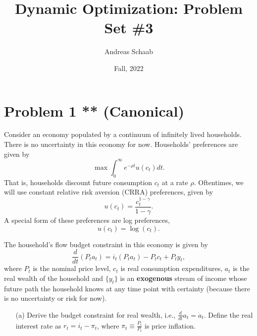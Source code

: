 \documentclass[11pt]{extarticle}
\title{Dynamic Optimization: Problem Set \#3}
\author{Andreas Schaab}
\date{Fall, 2022}
\theoremstyle{plain}
\theoremstyle{definition}
\begin{document}
\maketitle
\thispagestyle{empty}
\setcounter{page}{0}


\vspace{10mm}
\section*{Problem 1 ** (Canonical)}


Consider an economy populated by a continuum of infinitely lived households. There is no uncertainty in this economy for now. Households' preferences are given by
\begin{equation*}
	\max \int_0^\infty e^{-\rho t} u(c_t) dt.
\end{equation*}
That is, households discount future consumption $c_t$ at a rate $\rho$. Oftentimes, we will use constant relative risk aversion (CRRA) preferences, given by
\begin{equation*}
	u(c_t) = \frac{c_t^{1-\gamma}}{1-\gamma}.
\end{equation*}
A special form of these preferences are log preferences, 
\begin{equation*}
	u(c_t) = \log(c_t). 
\end{equation*}



The household's flow budget constraint in this economy is given by
\begin{equation*}
	\frac{d}{dt}(P_t a_t) = i_t (P_t a_t) - P_t c_t + P_t y_t,
\end{equation*}
where $P_t$ is the nominal price level, $c_t$ is real consumption expenditures, $a_t$ is the real wealth of the household and $\{y_t\}$ is an \textbf{exogenous} stream of income whose future path the household knows at any time point with certainty (because there is no uncertainty or risk for now).


\vspace{5mm}
\begin{enumerate}
\item [(a)] Derive the budget constraint for real wealth, i.e., $\frac{d}{dt} a_t = \dot a_t$. Define the real interest rate as $r_t = i_t - \pi_t$, where $\pi_t \equiv \frac{\dot P_t}{P_t}$ is price inflation.
\end{enumerate}
\end{document}
